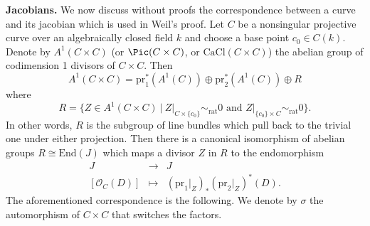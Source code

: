 \noindent
{\bf Jacobians.}
We now discuss without proofs the correspondence between a curve and its
jacobian which is used in Weil's proof. Let $C$ be a nonsingular projective
curve over an algebraically closed field $k$ and choose a base point $c_0 \in
C(k)$. Denote by $A^1(C \times C)$ (or $\Pic(C \times C)$, or
$\text{CaCl}(C \times C)$) the abelian group of codimension 1 divisors of
$C \times C$. Then
$$
A^1(C \times C) = \text{pr}_1^* (A^1(C)) \oplus \text{pr}_2^* (A^1(C)) \oplus R
$$
where
$$
R = \{ Z \in A^1(C \times C) \ |
\ Z|_{C \times \{c_0\}} \sim_\text{rat} 0
\text{ and }
Z|_{\{c_0\} \times C} \sim_\text{rat} 0 \}.
$$
In other words,
$R$ is the subgroup of line bundles which pull back to the trivial one under
either projection. Then there is a canonical isomorphism of abelian groups $R
\cong \text{End}(J)$ which maps a divisor $Z$ in $R$ to the endomorphism
$$
\begin{matrix}
J & \to & J \\
\left[ \mathcal{O}_C(D) \right] & \mapsto & (\text{pr}_1 |_Z)_* (\text{pr}_2
|_Z)^* (D).
\end{matrix}
$$
The aforementioned correspondence is the following. We denote by $\sigma$ the
automorphism of $C \times C$ that switches the factors.
